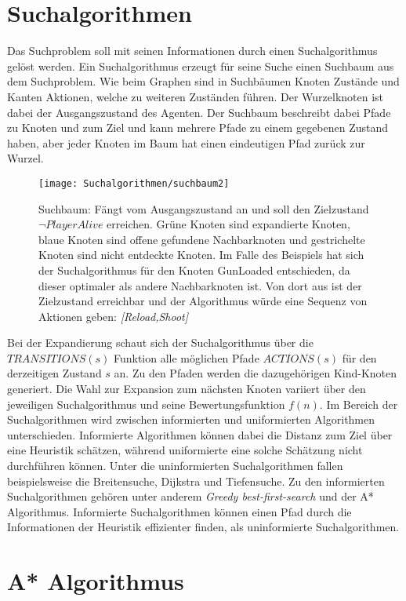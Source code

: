 \section{Suchalgorithmen}
Das Suchproblem soll mit seinen Informationen durch einen Suchalgorithmus gelöst werden. Ein Suchalgorithmus erzeugt für seine Suche einen Suchbaum aus dem Suchproblem. Wie beim Graphen sind in Suchbäumen Knoten Zustände und Kanten Aktionen, welche zu weiteren Zuständen führen. Der Wurzelknoten ist dabei der Ausgangszustand des Agenten. Der Suchbaum beschreibt dabei Pfade zu Knoten und zum Ziel und kann mehrere Pfade zu einem gegebenen Zustand haben, aber jeder Knoten im Baum hat einen eindeutigen Pfad zurück zur Wurzel.

\begin{figure}[h]
  \centering
  \texttt{[image: Suchalgorithmen/suchbaum2]}
	\captionsetup{justification=justified, format=plain}
  \caption{Suchbaum: Fängt vom Ausgangszustand an und soll den Zielzustand $\lnot \textit{PlayerAlive}$ erreichen. Grüne Knoten sind expandierte Knoten, blaue Knoten sind offene gefundene Nachbarknoten und gestrichelte Knoten sind nicht entdeckte Knoten. Im Falle des Beispiels hat sich der Suchalgorithmus für den Knoten GunLoaded entschieden, da dieser optimaler als andere Nachbarknoten ist. Von dort aus ist der Zielzustand erreichbar und der Algorithmus würde eine Sequenz von Aktionen geben: \textit{[Reload,Shoot]}}
  \label{Suchalgorithmen}
\end{figure}

Bei der Expandierung schaut sich der Suchalgorithmus über die $TRANSITIONS(s)$ Funktion alle möglichen Pfade $ACTIONS(s)$ für den derzeitigen Zustand $s$ an. Zu den Pfaden werden die dazugehörigen Kind-Knoten generiert. Die Wahl zur Expansion zum nächsten Knoten variiert über den jeweiligen Suchalgorithmus und seine Bewertungsfunktion $f(n)$. Im Bereich der Suchalgorithmen wird zwischen informierten und uniformierten Algorithmen unterschieden. Informierte Algorithmen können dabei die Distanz zum Ziel über eine Heuristik schätzen, während uniformierte eine solche Schätzung nicht durchführen können. Unter die uninformierten Suchalgorithmen fallen beispielsweise die Breitensuche, Dijkstra und Tiefensuche. Zu den informierten Suchalgorithmen gehören unter anderem \textit{Greedy best-first-search} und der A* Algorithmus. Informierte Suchalgorithmen können einen Pfad durch die Informationen der Heuristik effizienter finden, als uninformierte Suchalgorithmen.

\section{A* Algorithmus}

